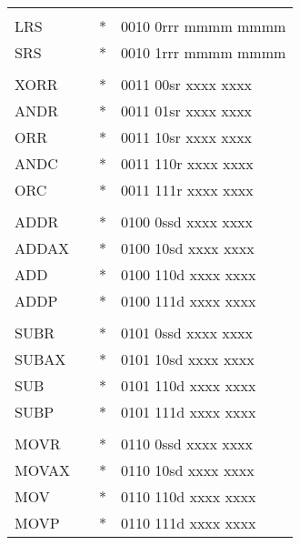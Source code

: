\documentclass[oneside,english,a4paper,10pt,oneside,openany,final]{memoir}
\begin{document}
\begin{center}
\begin{longtable}{TllT}
            &          &    &                                         \\
LRS         &          & *  & 0010 0rrr mmmm mmmm                     \\
SRS         &          & *  & 0010 1rrr mmmm mmmm                     \\
            &          &    &                                         \\
XORR        &          & *  & 0011 00sr xxxx xxxx                     \\
ANDR        &          & *  & 0011 01sr xxxx xxxx                     \\
ORR         &          & *  & 0011 10sr xxxx xxxx                     \\
ANDC        &          & *  & 0011 110r xxxx xxxx                     \\
ORC         &          & *  & 0011 111r xxxx xxxx                     \\
            &          &    &                                         \\
ADDR        &          & *  & 0100 0ssd xxxx xxxx                     \\
ADDAX       &          & *  & 0100 10sd xxxx xxxx                     \\
ADD         &          & *  & 0100 110d xxxx xxxx                     \\
ADDP        &          & *  & 0100 111d xxxx xxxx                     \\
            &          &    &                                         \\
SUBR        &          & *  & 0101 0ssd xxxx xxxx                     \\
SUBAX       &          & *  & 0101 10sd xxxx xxxx                     \\
SUB         &          & *  & 0101 110d xxxx xxxx                     \\
SUBP        &          & *  & 0101 111d xxxx xxxx                     \\
            &          &    &                                         \\
MOVR        &          & *  & 0110 0ssd xxxx xxxx                     \\
MOVAX       &          & *  & 0110 10sd xxxx xxxx                     \\
MOV         &          & *  & 0110 110d xxxx xxxx                     \\
MOVP        &          & *  & 0110 111d xxxx xxxx                     \\

\end{longtable}
\end{center}
\end{document}
